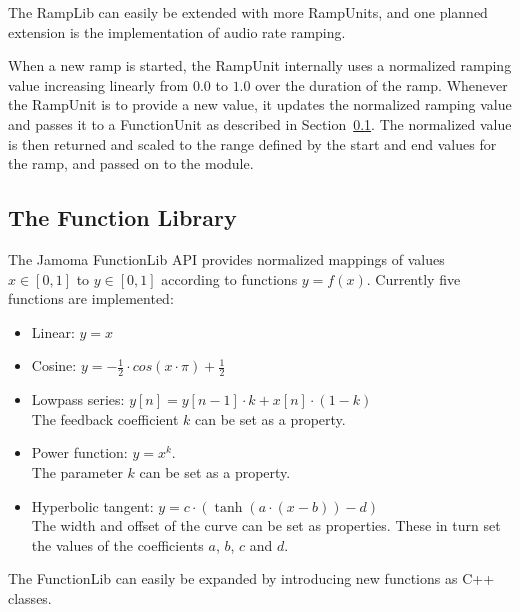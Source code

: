 \documentclass{article}
\begin{document}
The RampLib can easily be extended with more RampUnits, and one planned extension is the implementation of audio rate ramping.

When a new ramp is started, the RampUnit internally uses a normalized ramping value increasing linearly from $0.0$ to $1.0$ over the duration of the ramp. Whenever the RampUnit is to provide a new value, it updates the normalized ramping value and passes it to a FunctionUnit as described in Section~\ref{ssec:functionlib}. The normalized value is then returned and scaled to the range defined by the start and end values for the ramp, and passed on to the module.


\subsection{The Function Library} %
\label{ssec:functionlib}

The Jamoma FunctionLib API provides normalized mappings of values $x \in [0,1]$ to $y \in [0,1]$ according to functions $y = f(x)$. Currently five functions are implemented: 

\begin{itemize}
	\item Linear: $y = x$
	\item Cosine: $y = - \frac{1}{2} \cdot cos(x \cdot \pi ) + \frac{1}{2} $
	\item Lowpass series: $y[n] = y[n-1] \cdot k + x[n] \cdot (1-k)$ \\ The feedback coefficient $k$ can be set as a property.
	\item Power function: $ y = x^{k} $. \\ The parameter $k$ can be set as a property.
	\item Hyperbolic tangent: $ y = c \cdot (\tanh(a\cdot(x-b)) - d) $ \\ The width and offset of the curve can be set as properties.  These in turn set the values of the coefficients $a$, $b$, $c$ and $d$.
\end{itemize}

The FunctionLib can easily be expanded by introducing new functions as C++ classes.


\end{document}
